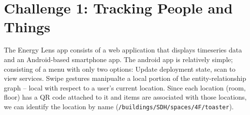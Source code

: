 




\section{Challenge 1: Tracking People and Things}
\label{sec:tracking}

The Energy Lens app consists of a web application that displays timeseries data and an Android-based smartphone
app.
The android app is relatively simple; consisting of a menu with only two options: Update deployment state, scan to view services.
Swipe gestures manipualte a local portion of the entity-relationship graph -- local with respect to a user's current location.
Since each location (room, floor) has a QR code attached to it and items are associated with those locations, we
can identify the location by name ({\tt /buildings/SDH/spaces/4F/toaster}).  

